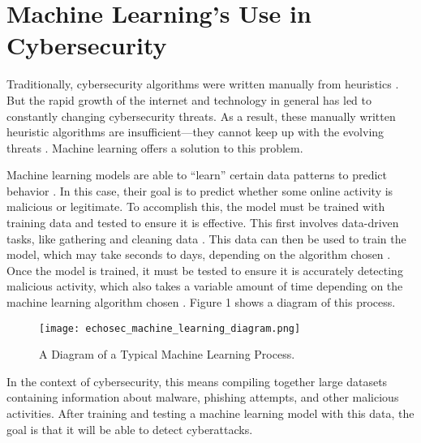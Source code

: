\section{Machine Learning's Use in Cybersecurity}

Traditionally, cybersecurity algorithms were written manually from heuristics \cite{sarker_kayes_badsha_2020}.
But the rapid growth of the internet and technology in general has led to constantly changing cybersecurity threats.
As a result, these manually written heuristic algorithms are insufficient---they cannot keep up with the evolving threats \cite{sarker_kayes_badsha_2020}.
Machine learning offers a solution to this problem.

Machine learning models are able to ``learn'' certain data patterns to predict behavior \cite{sarker_kayes_badsha_2020}.
In this case, their goal is to predict whether some online activity is malicious or legitimate.
To accomplish this, the model must be trained with training data and tested to ensure it is effective.
This first involves data-driven tasks, like gathering and cleaning data \cite{sarker_kayes_badsha_2020}.
This data can then be used to train the model, which may take seconds to days, depending on the algorithm chosen \cite{xin2018}.
Once the model is trained, it must be tested to ensure it is accurately detecting malicious activity, which also takes a variable amount of time depending on the machine learning algorithm chosen \cite{xin2018}.
Figure 1 shows a diagram of this process.

\begin{figure}[H]
    \centering
    \texttt{[image: echosec\_machine\_learning\_diagram.png]}
    \caption[Diagram of Machine Learning Process]{A Diagram of a Typical Machine Learning Process. \cite{echosec}}
\end{figure}

In the context of cybersecurity, this means compiling together large datasets containing information about malware, phishing attempts, and other malicious activities.
After training and testing a machine learning model with this data, the goal is that it will be able to detect cyberattacks.

